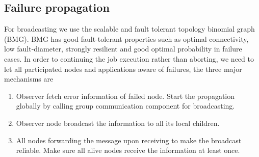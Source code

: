\documentclass[sigconf]{acmart}
\begin{document}
\subsection{Failure propagation}
For broadcasting we use the scalable and fault tolerant topology binomial graph (BMG)\cite{Angskun07}. BMG has good fault-tolerant properties such as optimal connectivity, low fault-diameter, strongly resilient and good optimal probability in failure cases. In order to continuing the job execution rather than aborting, we need to let all participated nodes and applications aware of failures, the three major mechanisms are 
\begin{enumerate}
  \item Observer fetch error information of failed node. Start the propagation globally by calling group communication component for broadcasting.
  \item Observer node broadcast the information to all its local children. 
  \item All nodes forwarding the message upon receiving to make the broadcast reliable. Make sure all alive nodes receive the information at least once. 
\end{enumerate}
\end{document}
